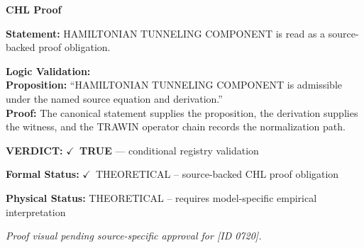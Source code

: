 \vspace{0.45em}
\noindent\textbf{CHL Proof}\par
\textbf{Statement:} HAMILTONIAN TUNNELING COMPONENT is read as a source-backed proof obligation.

\textbf{Logic Validation:}\\
\textbf{Proposition:} ``HAMILTONIAN TUNNELING COMPONENT is admissible under the named source equation and derivation.''\\
\textbf{Proof:} The canonical statement supplies the proposition, the derivation supplies the witness, and the TRAWIN operator chain records the normalization path.

\textbf{VERDICT:} \ensuremath{\checkmark}\ \textbf{TRUE} --- conditional registry validation

\textbf{Formal Status:} \ensuremath{\checkmark}\ THEORETICAL -- source-backed CHL proof obligation

\textbf{Physical Status:} THEORETICAL -- requires model-specific empirical interpretation
\par\vspace{0.45em}
\par
\vfill
\begingroup\footnotesize\itshape
Proof visual pending source-specific approval for [ID 0720].
\par\endgroup
\vfill
\endgroup
\endgroup
